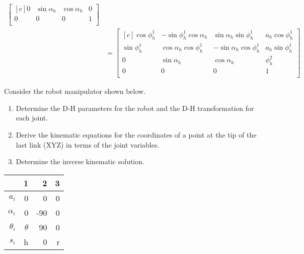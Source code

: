 \documentclass[onecolumn,10pt]{jhwhw}
\begin{document}
\begin{align*}
\begin{bmatrix*}[c]
0 & \sin \alpha_h &  \cos \alpha_h & 0\\
0 & 0 & 0 & 1 \\
\end{bmatrix*} \\
&=
\begin{bmatrix*}[c]
\cos \phi_h^1  &  -\sin \phi_h^1  \cos \alpha_h  &  \sin \alpha_h  \sin \phi_h^1  & a_h \cos \phi_h^1  \\
\sin \phi_h^1  &   \cos \alpha_h  \cos \phi_h^1  & -\sin \alpha_h  \cos \phi_h^1  & a_h \sin \phi_h^1  \\
             0 &                  \sin \alpha_h  &                 \cos \alpha_h &           \phi_h^2 \\
             0 &                               0 &                              0 &                  1 \\
\end{bmatrix*}
\end{align*}

\problem{}
Consider the robot manipulator shown below.
\begin{enumerate}
    \item Determine the D-H parameters for the robot and the D-H transformation for each joint.
    \item Derive the kinematic equations for the coordinates of a point at the tip of the last link (XYZ) in terms of the joint variables.
    \item Determine the inverse kinematic solution.
\end{enumerate}

\begin{center}
\begin{tabular}{r|rrr}
           & 1 & 2 & 3 \\
\midrule
$a_i$      &          0 &   0 &   0 \\
$\alpha_i$ &          0 & -90 &   0 \\    
$\theta_i$ &   $\theta$ &  90 &   0 \\ 
$s_i$      &          h &   0 &   r \\
\end{tabular}
\end{center}
\end{document}
